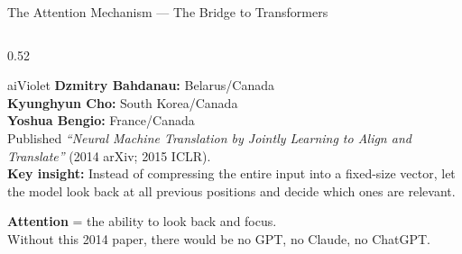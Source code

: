 \begin{frame}[shrink=23]{The Attention Mechanism --- The Bridge to Transformers}

  \begin{columns}[T]
    \begin{column}{0.52\textwidth}
      \begin{personbox}{aiViolet}
        \textbf{Dzmitry Bahdanau:} Belarus/Canada\\
        \textbf{Kyunghyun Cho:} South Korea/Canada\\
        \textbf{Yoshua Bengio:} France/Canada\\[3pt]
        Published \emph{``Neural Machine Translation by Jointly Learning
        to Align and Translate''} (2014 arXiv; 2015 ICLR).\\[3pt]
        \textbf{Key insight:} Instead of compressing the entire input
        into a fixed-size vector, let the model \alert{look back}
        at all previous positions and decide which ones are relevant.
      \end{personbox}

      \vspace{0.3em}
      \begin{tcolorbox}[colback=aiViolet!8,colframe=aiViolet,
        fonttitle=\bfseries,title={The Breakthrough},
        rounded corners,boxrule=1pt,left=4pt,right=4pt,top=3pt,bottom=3pt]
        \small \textbf{Attention} = the ability to look back and focus.\\[3pt]
        Without this 2014 paper, there would be no GPT,
        no Claude, no ChatGPT.
      \end{tcolorbox}
    \end{column}


\end{columns}
\end{frame}
